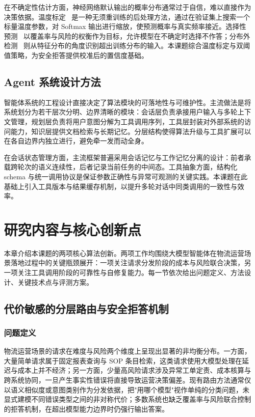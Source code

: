 在不确定性估计方面，神经网络默认输出的概率分布通常过于自信，难以直接作为决策依据。温度标定~\cite{tempscaling} 是一种无须重训练的后处理方法，通过在验证集上搜索一个标量温度参数，对 Softmax 输出进行缩放，使预测概率与真实频率接近。选择性预测~\cite{selectiveprediction} 以覆盖率与风险的权衡作为目标，允许模型在不确定时选择不作答；分布外检测~\cite{ood} 则从特征分布的角度识别超出训练分布的输入。本课题综合温度标定与双阈值策略，为安全拒答提供校准后的置信度基础。

\section{Agent 系统设计方法}

智能体系统的工程设计直接决定了算法模块的可落地性与可维护性。主流做法是将系统划分为若干层次分明、边界清晰的模块：会话层负责承接用户输入与多轮上下文管理，规划层负责将用户意图分解为工具调用序列，工具层封装对外部系统的访问能力，知识层提供文档检索与长期记忆。分层结构使得算法升级与工具扩展可以在各自边界内独立进行，避免牵一发而动全身。

在会话状态管理方面，主流框架普遍采用会话记忆与工作记忆分离的设计：前者承载跨轮次的语义连续性，后者记录当前任务的中间态。工具抽象方面，结构化 schema 与统一调用协议是保证参数正确性与异常可观测的关键实践。本课题在此基础上引入工具版本与结果缓存机制，以提升多轮对话中同类调用的一致性与效率。


\chapter{研究内容与核心创新点}

本章介绍本课题的两项核心算法创新。两项工作均围绕大模型智能体在物流运营场景落地过程中的关键瓶颈展开：一项关注请求分发阶段的成本与风险联合决策，另一项关注工具调用阶段的可靠性与自修复能力。每一节依次给出问题定义、方法设计、关键技术点与评测方案。

\section{代价敏感的分层路由与安全拒答机制}

\subsection{问题定义}

物流运营场景的请求在难度与风险两个维度上呈现出显著的非均衡分布。一方面，大量简单请求属于固定报表查询与 SOP 条目检索，这类请求使用大模型处理在延迟与成本上并不经济；另一方面，少量高风险请求涉及异常工单定责、成本核算与跨系统协同，一旦产生事实性错误将直接导致运营决策偏差。现有路由方法通常仅以语义相似度或意图类别作为分发依据，把"用哪个模型"视作单纯的分类问题，未显式建模不同错误类型之间的非对称代价；多数系统也缺乏覆盖率与风险联合控制的拒答机制，在超出模型能力边界时仍强行输出答案。

